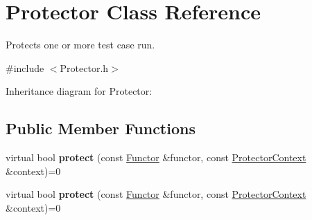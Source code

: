 \hypertarget{class_protector}{\section{Protector Class Reference}
\label{class_protector}
}


Protects one or more test case run.  




{\ttfamily \#include $<$Protector.\+h$>$}



Inheritance diagram for Protector\+:
\subsection*{Public Member Functions}
\begin{DoxyCompactItemize}
\item 
\hypertarget{class_protector_a8e005ff581ca40431526fb873a03415a}{virtual bool {\bfseries protect} (const \hyperlink{class_functor}{Functor} \&functor, const \hyperlink{class_protector_context}{Protector\+Context} \&context)=0}\label{class_protector_a8e005ff581ca40431526fb873a03415a}

\item 
\hypertarget{class_protector_a8e005ff581ca40431526fb873a03415a}{virtual bool {\bfseries protect} (const \hyperlink{class_functor}{Functor} \&functor, const \hyperlink{class_protector_context}{Protector\+Context} \&context)=0}\label{class_protector_a8e005ff581ca40431526fb873a03415a}

\end{DoxyCompactItemize}
